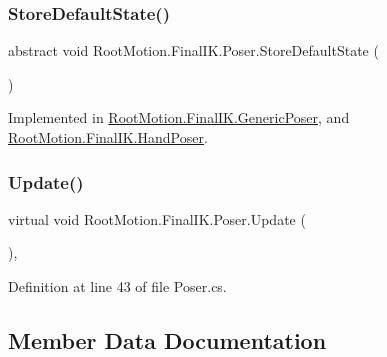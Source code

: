 \subsubsection{\texorpdfstring{Store\+Default\+State()}{StoreDefaultState()}}
{\footnotesize\ttfamily abstract void Root\+Motion.\+Final\+I\+K.\+Poser.\+Store\+Default\+State (\begin{DoxyParamCaption}{ }\end{DoxyParamCaption})\hspace{0.3cm}{\ttfamily [pure virtual]}}



Implemented in \mbox{\hyperlink{class_root_motion_1_1_final_i_k_1_1_generic_poser_a0f4a322e84b4b5101d8a491fa4521f9e}{Root\+Motion.\+Final\+I\+K.\+Generic\+Poser}}, and \mbox{\hyperlink{class_root_motion_1_1_final_i_k_1_1_hand_poser_a6da6c87d2f7d0eb7d3c3fb37da066ef8}{Root\+Motion.\+Final\+I\+K.\+Hand\+Poser}}.

\mbox{\label{class_root_motion_1_1_final_i_k_1_1_poser_a6391829da5511103e032ce27db9bfe88}} 
\subsubsection{\texorpdfstring{Update()}{Update()}}
{\footnotesize\ttfamily virtual void Root\+Motion.\+Final\+I\+K.\+Poser.\+Update (\begin{DoxyParamCaption}{ }\end{DoxyParamCaption})\hspace{0.3cm}{\ttfamily [protected]}, {\ttfamily [virtual]}}



Definition at line 43 of file Poser.\+cs.



\subsection{Member Data Documentation}
\mbox{\label{class_root_motion_1_1_final_i_k_1_1_poser_a4f05f4749055329895ecab5f357367ef}} 
